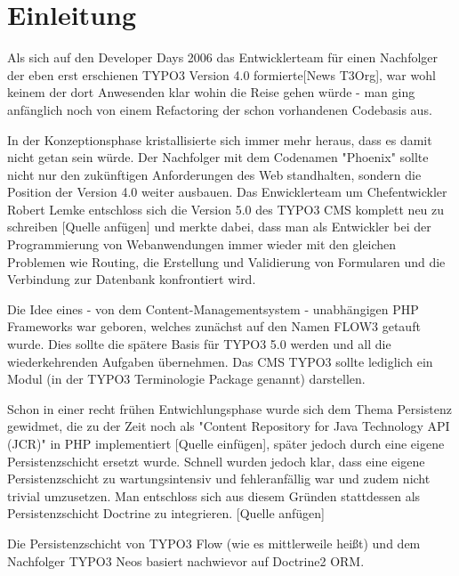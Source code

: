 \chapter{Einleitung}
\label{ch:intro}
Als sich auf den Developer Days 2006 das Entwicklerteam für einen Nachfolger der eben erst erschienen TYPO3 Version 4.0 formierte[News T3Org], war wohl keinem der dort Anwesenden klar wohin die Reise gehen würde - man ging anfänglich noch von einem Refactoring der schon vorhandenen Codebasis aus.

In der Konzeptionsphase kristallisierte sich immer mehr heraus, dass es damit nicht getan sein würde. Der Nachfolger mit dem Codenamen "Phoenix" sollte nicht nur den zukünftigen Anforderungen des Web standhalten, sondern die Position der Version 4.0 weiter ausbauen. Das Enwicklerteam um Chefentwickler Robert Lemke entschloss sich die Version 5.0 des TYPO3 CMS komplett neu zu schreiben [Quelle anfügen] und merkte dabei, dass man als Entwickler bei der Programmierung von Webanwendungen immer wieder mit den gleichen Problemen wie Routing, die Erstellung und Validierung von Formularen und die Verbindung zur Datenbank konfrontiert wird.

Die Idee eines - von dem Content-Managementsystem - unabhängigen PHP Frameworks war geboren, welches zunächst auf den Namen FLOW3 getauft wurde. Dies sollte die spätere Basis für TYPO3 5.0 werden und all die wiederkehrenden Aufgaben übernehmen. Das CMS TYPO3 sollte lediglich ein Modul (in der TYPO3 Terminologie Package genannt) darstellen.

Schon in einer recht frühen Entwichlungsphase wurde sich dem Thema Persistenz gewidmet, die zu der Zeit noch als "Content Repository for Java Technology API (JCR)" in PHP implementiert [Quelle einfügen], später jedoch durch eine eigene Persistenzschicht ersetzt wurde. Schnell wurden jedoch klar, dass eine eigene Persistenzschicht zu wartungsintensiv und fehleranfällig war und zudem nicht trivial umzusetzen. Man entschloss sich aus diesem Gründen stattdessen als Persistenzschicht Doctrine zu integrieren. [Quelle anfügen]

Die Persistenzschicht von TYPO3 Flow (wie es mittlerweile heißt) und dem Nachfolger TYPO3 Neos basiert nachwievor auf Doctrine2 ORM.

